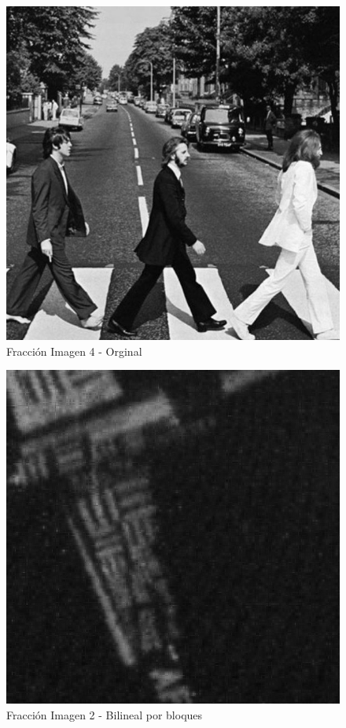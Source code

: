 \documentclass[a4paper]{article}
\begin{document}
     \begin{figure}[H]
    \centering
    \includegraphics[scale=0.5]{imagenes/imagen4informe2Original.png}
    \caption{Fracci\'on Imagen 4 - Orginal}
    \end{figure}

     \begin{figure}[H]
    \centering
    \includegraphics[scale=0.5]{imagenes/imagen2informe.png}
    \caption{Fracci\'on Imagen 2 - Bilineal por bloques}
    \end{figure}
\end{document}
